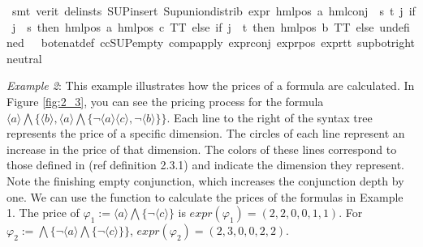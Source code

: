 \begin{isabellebody}
\ {\isacharparenleft}{\kern0pt}smt\ {\isacharparenleft}{\kern0pt}verit{\isacharcomma}{\kern0pt}\ del{\isacharunderscore}{\kern0pt}insts{\isacharparenright}{\kern0pt}\ SUP{\isacharunderscore}{\kern0pt}insert\ Sup{\isacharunderscore}{\kern0pt}union{\isacharunderscore}{\kern0pt}distrib\ {\isacartoucheopen}expr{\isacharunderscore}{\kern0pt}{}\ {\isacharparenleft}{\kern0pt}hml{\isacharunderscore}{\kern0pt}pos\ a\ {\isacharparenleft}{\kern0pt}hml{\isacharunderscore}{\kern0pt}conj\ {\isacharbraceleft}{\kern0pt}{\isacharbraceright}{\kern0pt}\ {\isacharbraceleft}{\kern0pt}s{\isacharcomma}{\kern0pt}\ t{\isacharbraceright}{\kern0pt}\ {\isacharparenleft}{\kern0pt}{\isasymlambda}j{\isachardot}{\kern0pt}\ if\ j\ {\isacharequal}{\kern0pt}\ s\ then\ hml{\isacharunderscore}{\kern0pt}pos\ a\ {\isacharparenleft}{\kern0pt}hml{\isacharunderscore}{\kern0pt}pos\ c\ TT{\isacharparenright}{\kern0pt}\ else\ if\ j\ {\isacharequal}{\kern0pt}\ t\ then\ hml{\isacharunderscore}{\kern0pt}pos\ b\ TT\ else\ undefined{\isacharparenright}{\kern0pt}{\isacharparenright}{\kern0pt}{\isacharparenright}{\kern0pt}\ {\isacharequal}{\kern0pt}\ {}{\isacartoucheclose}\ bot{\isacharunderscore}{\kern0pt}enat{\isacharunderscore}{\kern0pt}def\ ccSUP{\isacharunderscore}{\kern0pt}empty\ comp{\isacharunderscore}{\kern0pt}apply\ expr{\isacharunderscore}{\kern0pt}{}{\isacharunderscore}{\kern0pt}conj\ expr{\isacharunderscore}{\kern0pt}{}{\isacharunderscore}{\kern0pt}pos\ expr{\isacharunderscore}{\kern0pt}{}{\isacharunderscore}{\kern0pt}tt\ sup{\isacharunderscore}{\kern0pt}bot{\isachardot}{\kern0pt}right{\isacharunderscore}{\kern0pt}neutral{\isacharparenright}{\kern0pt}\isanewline
\ \ \isamarkupfalse%
%
\endisatagproof
{\isafoldproof}%
%
\isadelimproof
%
\endisadelimproof
%
\begin{isamarkuptext}%
\textit{Example 2}: This example illustrates how the prices of a formula are calculated. In Figure \ref{fig:2_3}, you can see the pricing process for the formula $\langle a \rangle \bigwedge \{\langle b \rangle, \langle a \rangle \bigwedge \{\lnot \langle a \rangle \langle c \rangle, \lnot \langle b \rangle\}\}$. Each line to the right of the syntax tree represents the price of a specific dimension. The circles of each line represent an increase in the price of that dimension. The colors of these lines correspond to those defined in (ref definition 2.3.1) and indicate the dimension they represent. Note the finishing empty conjunction, which increases the conjunction depth by one.
We can use the function to calculate the prices of the formulas in Example 1. The price of $\varphi_1 :=\langle a \rangle\bigwedge\{\lnot\langle c \rangle\}$ is $expr(\varphi_1) = (2, 2, 0, 0, 1, 1)$. For $\varphi_2 := \bigwedge\{\lnot\langle a \rangle\bigwedge\{\lnot\langle c \rangle\}\}$, $expr(\varphi_2) = (2, 3, 0, 0, 2, 2)$.%

\end{isamarkuptext}
\end{isabellebody}
